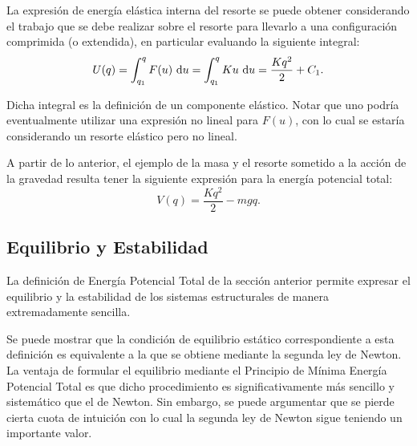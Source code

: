 La expresión de energía elástica interna del resorte se puede obtener considerando el trabajo que se debe realizar sobre el resorte para llevarlo a una configuración comprimida (o extendida), en particular evaluando la siguiente integral:
%
\begin{equation}
U(q) = \int_{q_1}^{q} F(u)\text{ }{\text{d}} u = \int_{q_1}^{q} Ku\text{ }{\text{d}} u = \frac{Kq^2}{2} + C_1.
\end{equation}

Dicha integral es la definición de un componente elástico. Notar que uno podría eventualmente utilizar una expresión no lineal para $F(u)$, con lo cual se estaría considerando un resorte elástico pero no lineal.

A partir de lo anterior, el ejemplo de la masa y el resorte sometido a la acción de la gravedad resulta tener la siguiente expresión para la energía potencial total:
%
\begin{equation}
	V(q) = \frac{Kq^2}{2} - mgq.
\end{equation}







\subsection{Equilibrio y Estabilidad}\label{TPE_EQ_STB}

La definición de Energía Potencial Total de la sección anterior permite expresar el equilibrio y la estabilidad de los sistemas estructurales de manera extremadamente sencilla.



Se puede mostrar que la condición de equilibrio estático correspondiente a esta definición es equivalente a la que se obtiene mediante la segunda ley de Newton. %
%
La ventaja de formular el equilibrio mediante el Principio de Mínima Energía Potencial Total es que dicho procedimiento es significativamente más sencillo y sistemático que el de Newton. Sin embargo, se puede argumentar que se pierde cierta cuota de intuición con lo cual la segunda ley de Newton sigue teniendo un importante valor.

